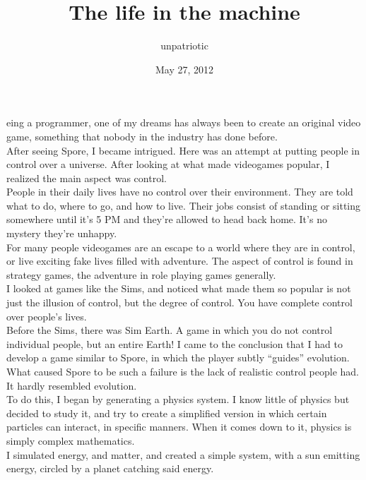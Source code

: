 \documentclass[a5paper]{scrartcl}
\title{The life in the machine}
\author{unpatriotic}
\date{May 27, 2012}
\begin{document}
\maketitle

eing a programmer, one of my dreams has always been to create an original video game, something that nobody in the industry has done before.\\


After seeing Spore, I became intrigued. Here was an attempt at putting people in control over a universe. After looking at what made videogames popular, I realized the main aspect was control.\\


People in their daily lives have no control over their environment. They are told what to do, where to go, and how to live. Their jobs consist of standing or sitting somewhere until it's 5 PM and they're allowed to head back home. It's no mystery they're unhappy.\\


For many people videogames are an escape to a world where they are in control, or live exciting fake lives filled with adventure. The aspect of control is found in strategy games, the adventure in role playing games generally.\\


I looked at games like the Sims, and noticed what made them so popular is not just the illusion of control, but the degree of control. You have complete control over people's lives.\\


Before the Sims, there was Sim Earth. A game in which you do not control individual people, but an entire Earth! I came to the conclusion that I had to develop a game similar to Spore, in which the player subtly \enquote{guides} evolution. What caused Spore to be such a failure is the lack of realistic control people had. It hardly resembled evolution.\\


To do this, I began by generating a physics system. I know little of physics but decided to study it, and try to create a simplified version in which certain particles can interact, in specific manners. When it comes down to it, physics is simply complex mathematics.\\


I simulated energy, and matter, and created a simple system, with a sun emitting energy, circled by a planet catching said energy.\\
\end{document}
